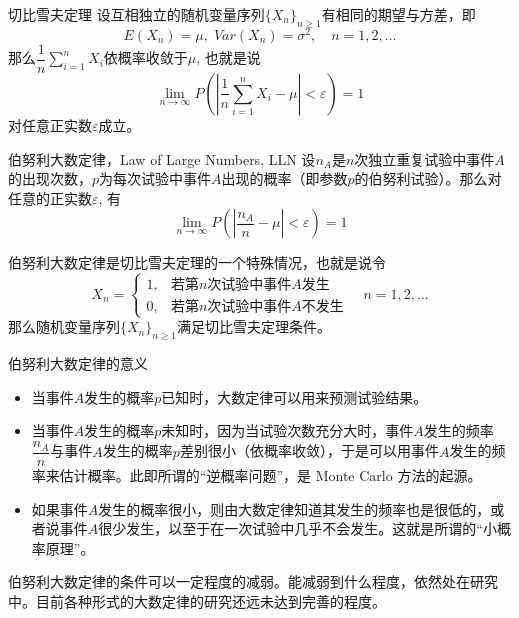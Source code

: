 \begin{frame}

\begin{block}{切比雪夫定理}
设互相独立的随机变量序列$\{X_n\}_{n\ge1}$有相同的期望与方差，即
\[E(X_n) = \mu, \; Var(X_n) = \sigma^2, \quad n=1,2,\ldots\]
那么$\dfrac{1}{n}\sum\limits_{i=1}^n X_i$依概率收敛于$\mu$, 也就是说
\[\lim\limits_{n\to\infty} P\left( \left\vert \dfrac{1}{n}\sum\limits_{i=1}^n X_i - \mu \right\vert < \varepsilon \right) = 1\]
对任意正实数$\varepsilon$成立。
\end{block}

\end{frame}


\begin{frame}

\begin{block}{伯努利大数定律，Law of Large Numbers, LLN}
设$n_A$是$n$次独立重复试验中事件$A$的出现次数，$p$为每次试验中事件$A$出现的概率（即参数$p$的伯努利试验）。那么对任意的正实数$\varepsilon$, 有
\[\lim\limits_{n\to\infty} P\left( \left\vert \dfrac{n_A}{n} - \mu \right\vert < \varepsilon \right) = 1\]
\end{block}

\vspace{1em}
\pause

伯努利大数定律是切比雪夫定理的一个特殊情况，也就是说令
\[X_n = \begin{cases}
1, & \text{若第$n$次试验中事件$A$发生} \\
0, & \text{若第$n$次试验中事件$A$不发生}
\end{cases} \quad n=1,2,\ldots\]
那么随机变量序列$\{X_n\}_{n\ge1}$满足切比雪夫定理条件。
\end{frame}


\begin{frame}

\begin{block}{伯努利大数定律的意义}
\begin{itemize}
\item 当事件$A$发生的概率$p$已知时，大数定律可以用来预测试验结果。
\item 当事件$A$发生的概率$p$未知时，因为当试验次数充分大时，事件$A$发生的频率$\dfrac{n_A}{n}$与事件$A$发生的概率$p$差别很小（依概率收敛），于是可以用事件$A$发生的频率来估计概率。此即所谓的``逆概率问题''，是 Monte Carlo 方法的起源。
\item 如果事件$A$发生的概率很小，则由大数定律知道其发生的频率也是很低的，或者说事件$A$很少发生，以至于在一次试验中几乎不会发生。这就是所谓的``小概率原理''。
\end{itemize}
\end{block}

\vspace{1em}
\pause

伯努利大数定律的条件可以一定程度的减弱。能减弱到什么程度，依然处在研究中。目前各种形式的大数定律的研究还远未达到完善的程度。

\end{frame}

